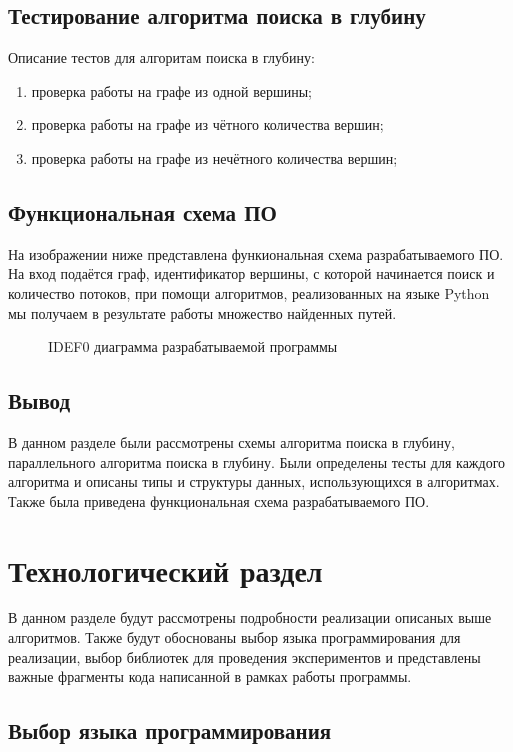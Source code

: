 \section{Тестирование алгоритма поиска в глубину}

Описание тестов для алгоритам поиска в глубину:
\begin{enumerate}
	\item проверка работы на графе из одной вершины;
	\item проверка работы на графе из чётного количества вершин;
	\item проверка работы на графе из нечётного количества вершин;
\end{enumerate}

\section{Функциональная схема ПО}
На изображении ниже представлена функиональная схема разрабатываемого ПО. На вход подаётся граф, идентификатор вершины, с которой начинается поиск и количество потоков, при помощи алгоритмов, реализованных на языке Python мы получаем в результате работы множество найденных путей.

\begin{figure}[ph!]
	\caption{IDEF0 диаграмма разрабатываемой программы}
\end{figure}

\section{Вывод}
В данном разделе были рассмотрены схемы алгоритма поиска в глубину, параллельного алгоритма поиска в глубину. Были определены тесты для каждого алгоритма и описаны типы и структуры данных, использующихся в алгоритмах. Также была приведена функциональная схема разрабатываемого ПО.

\chapter{Технологический раздел}

В данном разделе будут рассмотрены подробности реализации описаных выше алгоритмов. Также будут обоснованы выбор языка программирования для реализации, выбор библиотек для проведения экспериментов и представлены важные фрагменты кода написанной в рамках работы программы.

\section{Выбор языка программирования}

